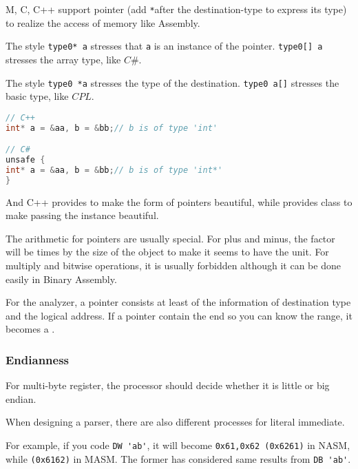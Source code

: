 M, C, C++ support pointer (add \verb`*`after the destination-type to express its type) to realize the access of memory like Assembly.

The style \verb|type0* a| stresses that \verb|a| is an instance of the pointer. \verb|type0[] a| stresses the array type, like $C\#$.

The style \verb|type0 *a| stresses the type of the destination. \verb|type0 a[]| stresses the basic type, like $CPL$.

\begin{lstlisting}[language=C++]
// C++
int* a = &aa, b = &bb;// b is of type 'int'

// C#
unsafe {
int* a = &aa, b = &bb;// b is of type 'int*'
}
\end{lstlisting}

And C++ provides  to make the form of pointers beautiful, while provides class to make passing the instance beautiful.

The arithmetic for pointers are usually special. For plus and minus, the factor will be times by the size of the object to make it seems to have the unit. For multiply and bitwise operations, it is usually forbidden although it can be done easily in Binary Assembly. 

For the analyzer, a pointer consists at least of the information of destination type and the logical address.
If a pointer contain the end so you can know the range, it becomes a .

\subsubsection{Endianness}

For multi-byte register, the processor should decide whether it is little or big endian.

When designing a parser, there are also different processes for literal immediate.

For example, if you code \verb|DW 'ab'|, it will become \verb"0x61,0x62 (0x6261)" in NASM, while \verb"(0x6162)" in MASM. The former has considered same results from \verb|DB 'ab'|. %



